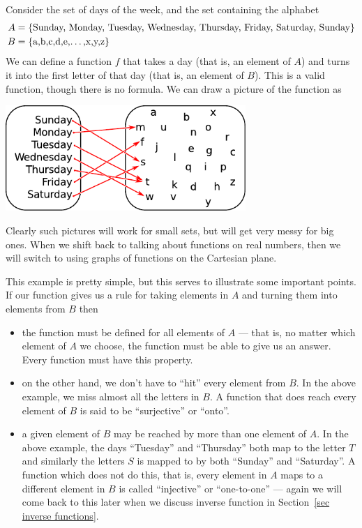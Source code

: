 Consider the set of days of the week, and the set containing the alphabet
\begin{align*}
  A &= \left\{\text{Sunday, Monday, Tuesday, Wednesday, Thursday, Friday,
Saturday, Sunday}\right\}\\
  B &= \left\{\text{a,b,c,d,e,\dots,x,y,z}\right\}
\end{align*}
We can define a function $f$ that takes a day (that is, an element of $A$) and
turns it into the first letter of that day (that is, an element of $B$). This
is a valid function, though there is no formula. We can draw a picture
of the function as
\begin{fig}
\begin{center}
 \includegraphics[height=4cm]{days}
\end{center}
\end{fig}
Clearly such pictures will work for small sets, but will get very messy for
big ones. When we shift back to talking about functions on real numbers, then we
will switch to using graphs of functions on the Cartesian plane.

This example is pretty simple, but this serves to illustrate some important
points. If our function gives us a rule for taking elements in $A$ and turning
them into elements from $B$ then
\begin{itemize}
 \item the function must be defined for all elements of $A$ --- that is, no
matter which element of $A$ we choose, the function must be able to give us an
answer. Every function must have this property.
 \item on the other hand, we don't have to ``hit'' every element from $B$. In
the above example, we miss almost all the letters in $B$. A function that does
reach every element of $B$ is said to be ``surjective'' or ``onto''.
\item a given element of $B$ may be reached by more than one element of $A$. In
the above example, the days ``Tuesday'' and ``Thursday'' both map to the
letter $T$ and similarly the letters $S$ is mapped to by both
``Sunday'' and ``Saturday''. A function which does not do this, that is, every
element in $A$ maps to a different element in $B$ is called ``injective'' or
``one-to-one'' --- again we will come back to this later when we discuss inverse function
in Section~\ref{sec inverse functions}.
\end{itemize}

